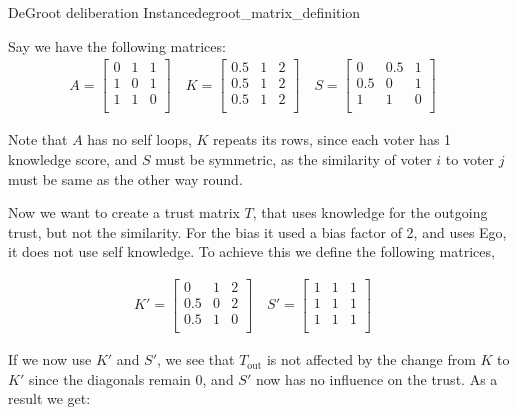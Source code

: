 \begin{example}{DeGroot deliberation Instance}{degroot_matrix_definition}

	Say we have the following matrices:
	\begin{align}
		A = \begin{bmatrix}
			    0 & 1 & 1 \\
			    1 & 0 & 1 \\
			    1 & 1 & 0 \\
		    \end{bmatrix} \quad
		K = \begin{bmatrix}
			    0.5 & 1 & 2 \\
			    0.5 & 1 & 2 \\
			    0.5 & 1 & 2 \\
		    \end{bmatrix}\quad
		S = \begin{bmatrix}
			    0   & 0.5 & 1 \\
			    0.5 & 0   & 1 \\
			    1   & 1   & 0 \\
		    \end{bmatrix}\quad
	\end{align}

	Note that $A$ has no self loops, $K$ repeats its rows, since each voter has 1
	knowledge score, and $S$ must be symmetric, as the similarity of voter $i$
	to voter $j$ must be same as the other way round.

	Now we want to create a trust matrix $T$, that uses knowledge for the outgoing trust, but not the similarity. For the bias it used a bias factor of 2, and uses Ego, it does not use self knowledge. To achieve this we define the following matrices,

	\begin{align}
		K' = \begin{bmatrix}
			     0   & 1 & 2 \\
			     0.5 & 0 & 2 \\
			     0.5 & 1 & 0 \\
		     \end{bmatrix}\quad
		S' = \begin{bmatrix}
			     1 & 1 & 1 \\
			     1 & 1 & 1 \\
			     1 & 1 & 1 \\
		     \end{bmatrix}\quad
	\end{align}

	If we now use $K'$ and $S'$, we see that $T_{\text{out}}$ is not
	affected by the change from $K$ to $K'$ since the diagonals remain 0,
	and $S'$ now has no influence on the trust. As a result we get:


\end{example}
